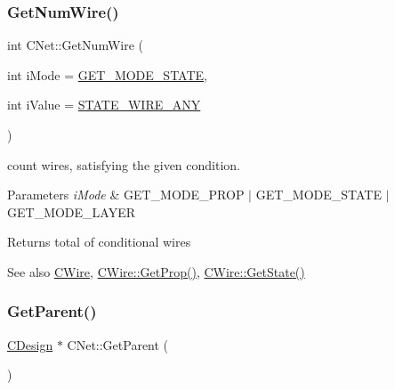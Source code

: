 \mbox{\label{classCNet_ae194cdbb585414b5eb533d0d097944b3}} 
\subsubsection{\texorpdfstring{GetNumWire()}{GetNumWire()}}
{\footnotesize\ttfamily int C\+Net\+::\+Get\+Num\+Wire (\begin{DoxyParamCaption}\item[{int}]{i\+Mode = {\ttfamily \mbox{\hyperlink{BoxRouter_8h_a6f72f2cc9dd31793dd832ccfb2547de4}{G\+E\+T\+\_\+\+M\+O\+D\+E\+\_\+\+S\+T\+A\+TE}}},  }\item[{int}]{i\+Value = {\ttfamily \mbox{\hyperlink{BoxRouter_8h_a1b285251edd87e1423189470586cc719}{S\+T\+A\+T\+E\+\_\+\+W\+I\+R\+E\+\_\+\+A\+NY}}} }\end{DoxyParamCaption})}



count wires, satisfying the given condition. 


\begin{DoxyParams}{Parameters}
{\em i\+Mode} & G\+E\+T\+\_\+\+M\+O\+D\+E\+\_\+\+P\+R\+OP $\vert$ G\+E\+T\+\_\+\+M\+O\+D\+E\+\_\+\+S\+T\+A\+TE $\vert$ G\+E\+T\+\_\+\+M\+O\+D\+E\+\_\+\+L\+A\+Y\+ER \\
\hline
\end{DoxyParams}
\begin{DoxyReturn}{Returns}
total of conditional wires 
\end{DoxyReturn}
\begin{DoxySeeAlso}{See also}
\mbox{\hyperlink{classCWire}{C\+Wire}}, \mbox{\hyperlink{classCObject_afc32a8e7c4450a95c2a6333d7e3319b4}{C\+Wire\+::\+Get\+Prop()}}, \mbox{\hyperlink{classCObject_a94f72fd4b4155dc18decb9d53f42dc99}{C\+Wire\+::\+Get\+State()}} 
\end{DoxySeeAlso}
\mbox{\label{classCNet_a920188d5e3abdca198ad85d4299ea10d}} 
\subsubsection{\texorpdfstring{GetParent()}{GetParent()}}
{\footnotesize\ttfamily \mbox{\hyperlink{classCDesign}{C\+Design}} $\ast$ C\+Net\+::\+Get\+Parent (\begin{DoxyParamCaption}{ }\end{DoxyParamCaption})}

